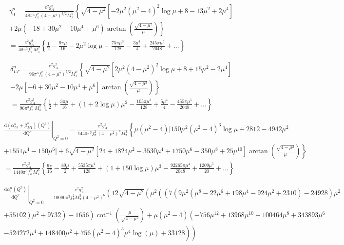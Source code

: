 \documentclass[twocolumn,prc,showpacs,nofootinbib,preprintnumbers,amsmath,amssymb,superscriptaddress]{revtex4-1}
\def\dd{\mathrm{d}}
\begin{document}
\begin{widetext}
{\begin{align}
&\gamma_0^n = \frac{e^2 g_A^2}{48\pi^3 f_\pi^2\,  (4-\mu^2)^{5/2} M_\pi^2} \left\{ \sqrt{4-\mu^2} [ -2\mu^2(\mu^2-4)^2  \log\mu + 8 - 13 \mu^2 + 2 \mu^4 ] \right. \nonumber\\
&\left. + 2 \mu (-18  + 30 \mu^2 - 10 \mu^4 + \mu^6) \arctan\left( \frac{\sqrt{4-\mu^2}}{\mu}\right) \right\}\nonumber \\
&=\frac{e^2 g_A^2}{48\pi^3 f_\pi^2\,  M_\pi^2}\left\{ \frac{1}{2}-\frac{9\pi \mu}{16} -  2\mu^2 \log\mu  + \frac{75 \pi \mu^3}{128} - \frac{3 \mu^4}{4} + \frac{245 \pi \mu^5}{2048} + \dots \right\}
\end{align}


\begin{align}
&\delta^n_{LT} = \frac{e^2 g_A^2}{96\pi^3 f_\pi^2\, (4-\mu^2)^{5/2} M_\pi^2} \left\{ \sqrt{4-\mu^2} [ 2 \mu^2 (4-\mu^2)^2  \log\mu + 8+15 \mu^2 -2 \mu^4] \nonumber \right.\\
&\left.  - 2 \mu [-6 +30 \mu^2 -10\mu^4 + \mu^6] \arctan\left( \frac{\sqrt{4-\mu^2}}{\mu} \right)      \right\}\nonumber \\
&=\frac{e^2 g_A^2}{96\pi^3 f_\pi^2\, M_\pi^2} \left\{ \frac{1}{2} + \frac{3 \pi \mu}{16} + \left(1+2\log\mu\right)\mu^2 - \frac{105 \pi \mu^3}{128} + \frac{5\mu^4}{4}  - \frac{455 \pi \mu^5}{2048} + \dots\right\} 
\end{align}


\begin{align}
&\left.\frac{\dd(\alpha_{E1}^n+\beta_{M1}^n) (Q^2)}{\dd Q^2}\right|_{Q^2=0}=\frac{e^2 g_A^2}{1440 \pi^3 f_\pi^2\,  (4-\mu^2)^{4} M_\pi^3}\left\{ \mu(\mu^2-4) [150\mu^2 (\mu^2-4)^3  \log\mu +2812-4942 \mu^2\right. \nonumber \\
&\left. + 1551 \mu^4-150 \mu^6]  + 6 \sqrt{4-\mu^2}[24+1824 \mu^2 - 3530 \mu^4 + 1750 \mu^6 -350 \mu^8 + 25 \mu^{10}] \arctan\left( \frac{\sqrt{4-\mu^2}}{\mu}\right) \right\} \nonumber \\
&= \frac{e^2 g_A^2}{1440 \pi^3 f_\pi^2\,  M_\pi^3} \left\{  \frac{9 \pi}{16} -\frac{89 \mu}{2} + \frac{5535 \pi \mu^2}{128} + \left( 1+ 150 \log\mu\right)\mu^3 -\frac{92265  \pi \mu^4}{2048}  +  \frac{1209 \mu^5}{20} +\dots  \right\}
\end{align}



\begin{align}
&\left.\frac{\dd\alpha_{L}^n (Q^2)}{\dd Q^2}\right|_{Q^2=0}=\frac{e^2 g_A^2}{10080 \pi ^3 f_\pi^2 M_\pi^5 \left(4-\mu ^2\right)^6
   } \left(12 \sqrt{4-\mu ^2} \left(\mu ^2 \left(\left(7 \left(9 \mu ^2 \left(\mu ^8-22 \mu ^6+198 \mu ^4-924 \mu
   ^2+2310\right)-24928\right) \mu ^2 \right.\right.\right.\right.\nonumber \\ 
&  \left. \left.\left.+55102\right) \mu ^2+9732\right)-1656\right) \cot ^{-1}\left(\frac{\mu }{\sqrt{4-\mu
   ^2}}\right)+\mu  \left(\mu ^2-4\right) \left(-756 \mu ^{12}+13968 \mu ^{10}-100464 \mu ^8+343893 \mu ^6 \right.\nonumber \\
&   \left.\left.-524272 \mu ^4+148400 \mu
   ^2+756 \left(\mu ^2-4\right)^5 \mu ^4 \log (\mu )+33128\right)\right)
\end{align}


}
\end{widetext}
\end{document}
